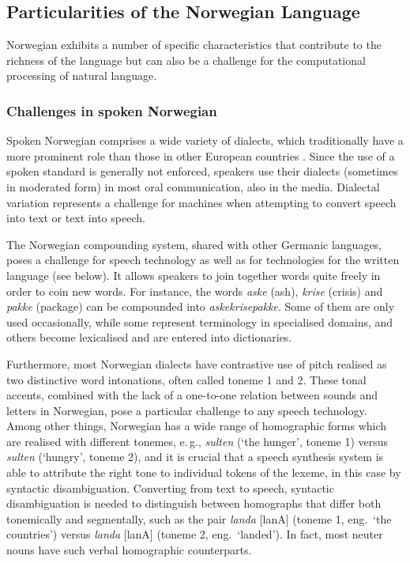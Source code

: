 \begin{multicols}{2}
\subsection{Particularities of the Norwegian Language}

Norwegian exhibits a number of specific characteristics that contribute to the richness of the language but can also be a challenge for the computational processing of natural language. 

\subsubsection{Challenges in spoken Norwegian}
Spoken Norwegian comprises a wide variety of dialects, which traditionally have a more prominent role than those in other European countries \cite{stm35:2008}.
Since the use of a spoken standard is generally not enforced, speakers use their dialects (sometimes in moderated form) in most oral communication, also in the media.
Dialectal variation represents a challenge for machines when attempting to convert speech into text or text into speech.


The Norwegian compounding system, shared with other Germanic languages, poses a challenge for speech technology as well as for technologies for the written language (see below). 
It allows speakers to join together words quite freely in order to coin new words. 
For instance, the words \textit{aske} (ash), \textit{krise} (crisis) and \textit{pakke} (package) can be compounded into \textit{askekrisepakke}. 
Some of them are only used occasionally, while some represent terminology in specialised domains, and others become lexicalised and are entered into dictionaries. 

Furthermore, most Norwegian dialects have contrastive use of pitch realised as two distinctive word intonations, often called toneme 1 and 2. 
These tonal accents, combined with the lack of a one-to-one relation between sounds and letters in Norwegian, pose a particular challenge to any speech technology. 
Among other things, Norwegian has a wide range of homographic forms
which are realised with different tonemes, e.\,g., \textit{sulten} (‘the hunger’, toneme 1) versus \textit{sulten} (‘hungry’, toneme 2), and it is crucial that a speech synthesis system is able to attribute the right tone to individual tokens of the lexeme, in this case by syntactic disambiguation. 
Converting from text to speech, syntactic disambiguation is needed to distinguish between homographs that differ both tonemically and segmentally, such as the pair \textit{landa} {[}lanA{]} (toneme 1, eng.~`the countries') versus \textit{landa} {[}lanA{]} (toneme 2, eng.~`landed'). 
In fact, most neuter nouns have such verbal homographic counterparts.


\end{multicols}
